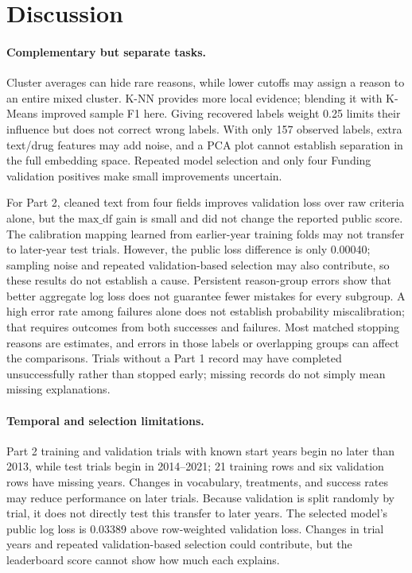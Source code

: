 \documentclass[10pt,twocolumn,letterpaper]{article}
\begin{document}
\section{Discussion}
\paragraph{Complementary but separate tasks.}
Cluster averages can hide rare reasons, while lower cutoffs may assign a reason
to an entire mixed cluster. K-NN provides more local evidence; blending it with
K-Means improved sample F1 here. Giving recovered labels weight 0.25 limits their
influence but does not correct wrong labels. With only 157 observed labels,
extra text/drug features may add noise, and a PCA plot cannot establish separation
in the full embedding space. Repeated model selection and only four Funding
validation positives make small improvements uncertain.

For Part 2, cleaned text from four fields improves validation loss over raw
criteria alone, but the $\mathrm{max\_df}$ gain is small and did not change the
reported public score. The calibration mapping learned from earlier-year
training folds may not transfer to later-year test trials. However, the public
loss difference is only 0.00040; sampling noise and repeated validation-based
selection may also contribute, so these results do not establish a cause.
Persistent reason-group errors show that better aggregate log loss does not
guarantee fewer mistakes for every subgroup. A high error rate among failures
alone does not establish probability miscalibration; that requires outcomes
from both successes and failures.
Most matched stopping reasons are estimates, and errors in those labels or
overlapping groups can affect the comparisons. Trials without a Part 1 record
may have completed unsuccessfully rather than stopped early; missing records
do not simply mean missing explanations.

\paragraph{Temporal and selection limitations.}
Part 2 training and validation trials with known start years begin no later than
2013, while test trials begin in 2014--2021; 21 training rows and six validation
rows have missing years. Changes in vocabulary, treatments, and success rates
may reduce performance on later trials. Because validation is split randomly
by trial, it does not directly test this transfer to later years. The selected
model's public log loss is 0.03389 above row-weighted validation loss. Changes
in trial years and repeated validation-based selection could contribute, but
the leaderboard score cannot show how much each explains.
\end{document}

